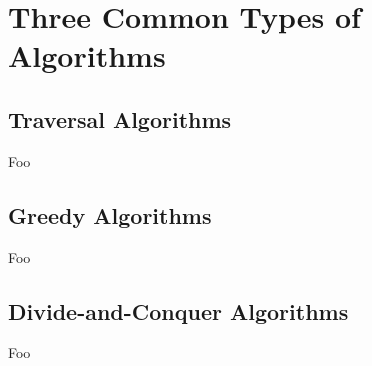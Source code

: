 \section{Three Common Types of Algorithms}

\subsection{Traversal Algorithms}

Foo

\subsection{Greedy Algorithms}

Foo

\subsection{Divide-and-Conquer Algorithms}

Foo

